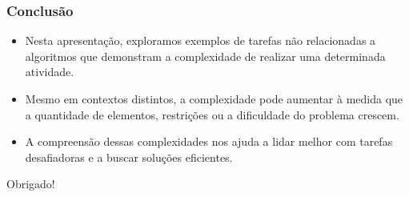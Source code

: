 \documentclass[12pt]{beamer}
\begin{document}
\begin{frame}
    \frametitle{Conclusão}

    \begin{itemize}
        \item Nesta apresentação, exploramos exemplos de tarefas não relacionadas a algoritmos que demonstram a complexidade de realizar uma determinada atividade.
        \item Mesmo em contextos distintos, a complexidade pode aumentar à medida que a quantidade de elementos, restrições ou a dificuldade do problema crescem.
        \item A compreensão dessas complexidades nos ajuda a lidar melhor com tarefas desafiadoras e a buscar soluções eficientes.
    \end{itemize}

    \vspace{1cm}
    Obrigado!

\end{frame}
\end{document}
